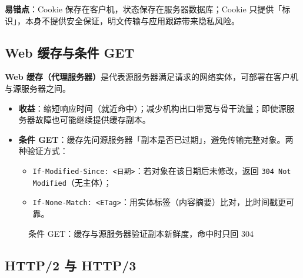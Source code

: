 \noindent\textbf{易错点}：Cookie 保存在客户机，状态保存在服务器数据库；Cookie 只提供「标识」，本身不提供安全保证，明文传输与应用跟踪带来隐私风险。

\subsection{Web 缓存与条件 GET}

\textbf{Web 缓存（代理服务器）}是代表源服务器满足请求的网络实体，可部署在客户机与源服务器之间。

\begin{itemize}
    \item \textbf{收益}：缩短响应时间（就近命中）；减少机构出口带宽与骨干流量；即使源服务器故障也可能继续提供缓存副本。
    \item \textbf{条件 GET}：缓存先问源服务器「副本是否已过期」，避免传输完整对象。两种验证方式：
    \begin{itemize}
        \item \texttt{If-Modified-Since: <日期>}：若对象在该日期后未修改，返回 \texttt{304 Not Modified}（无主体）；
        \item \texttt{If-None-Match: <ETag>}：用实体标签（内容摘要）比对，比时间戳更可靠。
    \end{itemize}
\end{itemize}

\begin{figure}[H]
\centering
{}
\caption{条件 GET：缓存与源服务器验证副本新鲜度，命中时只回 304}
\label{fig:conditional_get}
\end{figure}

\subsection{HTTP/2 与 HTTP/3}

